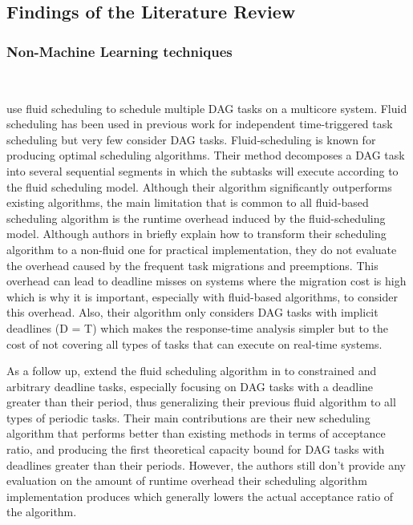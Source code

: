 \subsection{Findings of the Literature Review}

\subsubsection{Non-Machine Learning techniques}
~


\citet{guan2021DAGfluid} 
use fluid scheduling to schedule multiple DAG tasks
on a multicore system. 
Fluid scheduling has been used in previous work for independent
time-triggered task scheduling\cite{baruah1993PFair}\cite{cho2006LLREF} 
but very few consider DAG tasks. Fluid-scheduling is known for producing optimal scheduling algorithms.
Their method decomposes a DAG task into several sequential segments
in which the subtasks will execute according to the fluid scheduling 
model. Although their algorithm significantly outperforms
existing algorithms, the main limitation that is common to all fluid-based
scheduling algorithm is the runtime overhead induced by the fluid-scheduling model.
Although authors in \cite{guan2021DAGfluid} briefly explain how 
to transform their scheduling algorithm to a non-fluid one for practical implementation,
they do not evaluate the overhead caused by the frequent task migrations
and preemptions. This overhead can lead to deadline misses
on systems where the migration cost is high which is why it is important,
especially with fluid-based algorithms, to consider this overhead\cite{migrationCostFairSched}.
 Also, their algorithm only considers DAG tasks with implicit deadlines
(D = T) which makes the response-time analysis simpler but to the cost
of not covering all types of tasks that can execute on real-time systems.

As a follow up, \citet{GuanFluidDag2022} 
extend the fluid scheduling algorithm in \cite{guan2021DAGfluid}
to constrained and arbitrary deadline tasks,
especially focusing on DAG tasks with a deadline greater than their period,
thus generalizing their previous fluid algorithm
to all types of periodic tasks.
Their main contributions are their new scheduling algorithm that 
performs better than existing methods in terms of acceptance ratio,
and producing the first theoretical capacity bound for DAG tasks
with deadlines greater than their periods.
However, the authors still don't provide any evaluation 
on the amount of runtime overhead their scheduling algorithm implementation
produces which generally lowers the actual acceptance ratio
of the algorithm. 

